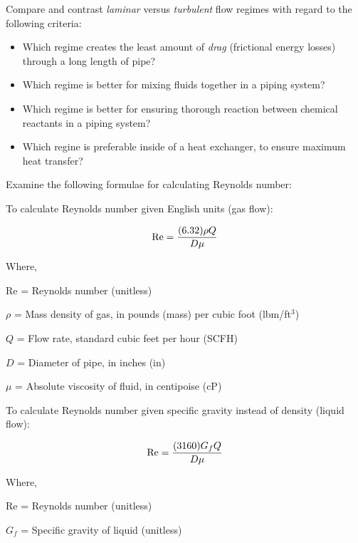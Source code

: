 

\noindent
Compare and contrast {\it laminar} versus {\it turbulent} flow regimes with regard to the following criteria:

\vskip 10pt

\begin{itemize}
\item{} Which regime creates the least amount of {\it drag} (frictional energy losses) through a long length of pipe? 
\vskip 10pt
\item{} Which regime is better for mixing fluids together in a piping system?
\vskip 10pt
\item{} Which regime is better for ensuring thorough reaction between chemical reactants in a piping system?
\vskip 10pt
\item{} Which regine is preferable inside of a heat exchanger, to ensure maximum heat transfer?
\end{itemize}

\vskip 30pt

\noindent
Examine the following formulae for calculating Reynolds number:

\vskip 10pt

To calculate Reynolds number given English units (gas flow):

$$\hbox{Re} = {{(6.32) \rho Q} \over {D \mu}}$$

\noindent
Where,

Re = Reynolds number (unitless)

$\rho$ = Mass density of gas, in pounds (mass) per cubic foot (lbm/ft$^{3}$)

$Q$ = Flow rate, standard cubic feet per hour (SCFH)

$D$ = Diameter of pipe, in inches (in)

$\mu$ = Absolute viscosity of fluid, in centipoise (cP)

\vskip 20pt \goodbreak

To calculate Reynolds number given specific gravity instead of density (liquid flow):

$$\hbox{Re} = {{(3160) G_f Q} \over {D \mu}}$$

\noindent
Where,

Re = Reynolds number (unitless)

$G_f$ = Specific gravity of liquid (unitless)


